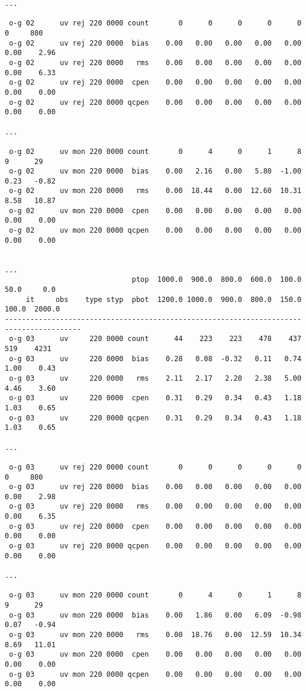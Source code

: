 \begin{scriptsize}
\begin{verbatim}
...

 o-g 02      uv rej 220 0000 count       0      0      0      0      0      0     800
 o-g 02      uv rej 220 0000  bias    0.00   0.00   0.00   0.00   0.00   0.00    2.96
 o-g 02      uv rej 220 0000   rms    0.00   0.00   0.00   0.00   0.00   0.00    6.33
 o-g 02      uv rej 220 0000  cpen    0.00   0.00   0.00   0.00   0.00   0.00    0.00
 o-g 02      uv rej 220 0000 qcpen    0.00   0.00   0.00   0.00   0.00   0.00    0.00

...

 o-g 02      uv mon 220 0000 count       0      4      0      1      8      9      29
 o-g 02      uv mon 220 0000  bias    0.00   2.16   0.00   5.80  -1.00   0.23   -0.82
 o-g 02      uv mon 220 0000   rms    0.00  18.44   0.00  12.60  10.31   8.58   10.87
 o-g 02      uv mon 220 0000  cpen    0.00   0.00   0.00   0.00   0.00   0.00    0.00
 o-g 02      uv mon 220 0000 qcpen    0.00   0.00   0.00   0.00   0.00   0.00    0.00


...
                              ptop  1000.0  900.0  800.0  600.0  100.0   50.0     0.0
     it     obs    type styp  pbot  1200.0 1000.0  900.0  800.0  150.0  100.0  2000.0
----------------------------------------------------------------------------------------
 o-g 03      uv     220 0000 count      44    223    223    478    437    519    4231
 o-g 03      uv     220 0000  bias    0.28   0.08  -0.32   0.11   0.74   1.00    0.43
 o-g 03      uv     220 0000   rms    2.11   2.17   2.20   2.38   5.00   4.46    3.60
 o-g 03      uv     220 0000  cpen    0.31   0.29   0.34   0.43   1.18   1.03    0.65
 o-g 03      uv     220 0000 qcpen    0.31   0.29   0.34   0.43   1.18   1.03    0.65

...

 o-g 03      uv rej 220 0000 count       0      0      0      0      0      0     800
 o-g 03      uv rej 220 0000  bias    0.00   0.00   0.00   0.00   0.00   0.00    2.98
 o-g 03      uv rej 220 0000   rms    0.00   0.00   0.00   0.00   0.00   0.00    6.35
 o-g 03      uv rej 220 0000  cpen    0.00   0.00   0.00   0.00   0.00   0.00    0.00
 o-g 03      uv rej 220 0000 qcpen    0.00   0.00   0.00   0.00   0.00   0.00    0.00

...

 o-g 03      uv mon 220 0000 count       0      4      0      1      8      9      29
 o-g 03      uv mon 220 0000  bias    0.00   1.86   0.00   6.09  -0.98   0.07   -0.94
 o-g 03      uv mon 220 0000   rms    0.00  18.76   0.00  12.59  10.34   8.69   11.01
 o-g 03      uv mon 220 0000  cpen    0.00   0.00   0.00   0.00   0.00   0.00    0.00
 o-g 03      uv mon 220 0000 qcpen    0.00   0.00   0.00   0.00   0.00   0.00    0.00

\end{verbatim}
\end{scriptsize}

